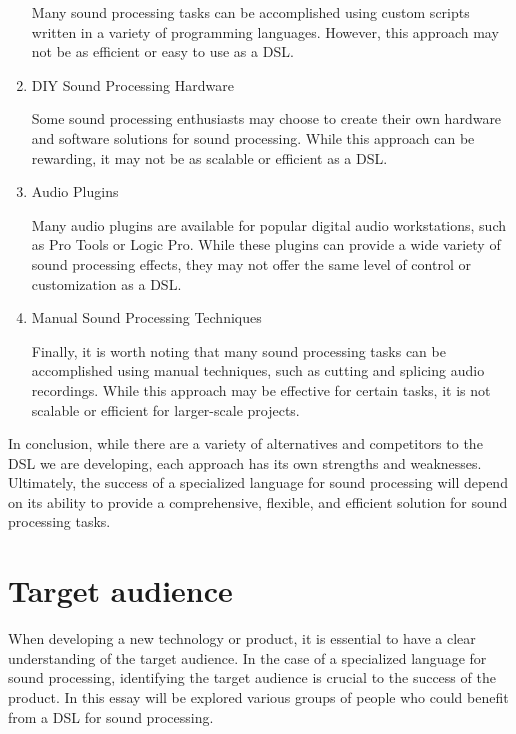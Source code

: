 \begin{enumerate}
Many sound processing tasks can be accomplished using custom scripts written in a variety of programming languages. However, this approach may not be as efficient or easy to use as a DSL.

\item DIY Sound Processing Hardware

Some sound processing enthusiasts may choose to create their own hardware and software solutions for sound processing. While this approach can be rewarding, it may not be as scalable or efficient as a DSL.

\item Audio Plugins

Many audio plugins are available for popular digital audio workstations, such as Pro Tools or Logic Pro. While these plugins can provide a wide variety of sound processing effects, they may not offer the same level of control or customization as a DSL.

\item Manual Sound Processing Techniques

Finally, it is worth noting that many sound processing tasks can be accomplished using manual techniques, such as cutting and splicing audio recordings. While this approach may be effective for certain tasks, it is not scalable or efficient for larger-scale projects.

\end{enumerate}

In conclusion, while there are a variety of alternatives and competitors to the DSL we are developing, each approach has its own strengths and weaknesses. Ultimately, the success of a specialized language for sound processing will depend on its ability to provide a comprehensive, flexible, and efficient solution for sound processing tasks.

\section{Target audience} 
When developing a new technology or product, it is essential to have a clear understanding of the target audience. In the case of a specialized language for sound processing, identifying the target audience is crucial to the success of the product. In this essay will be explored various groups of people who could benefit from a DSL for sound processing.

